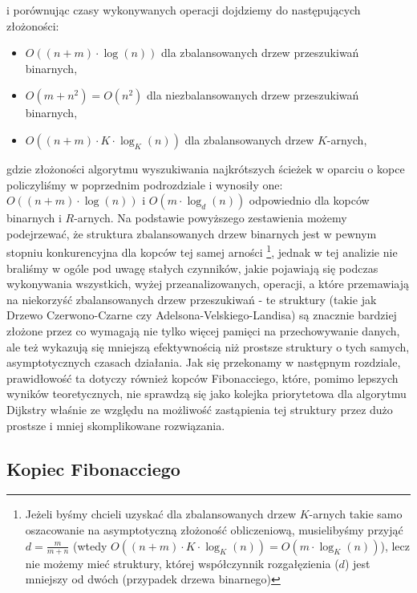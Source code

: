 i porównując czasy wykonywanych operacji dojdziemy do następujących złożoności:

\begin{itemize}
\item $ O \left( \left( n + m \right) \cdot \log \left( n \right) \right)$  dla zbalansowanych drzew przeszukiwań binarnych,
\item $ O \left( m + n^{2} \right) = O \left( n^{2} \right) $ dla niezbalansowanych drzew przeszukiwań binarnych,
\item $ O \left( \left( n + m \right) \cdot K \cdot \log_{K} \left( n \right) \right)$  dla zbalansowanych drzew $K$-arnych,
\end{itemize}

gdzie złożoności algorytmu wyszukiwania najkrótszych ścieżek w oparciu o kopce policzyliśmy w poprzednim podrozdziale i wynosiły one: $ O \left( \left( n + m \right) \cdot \log \left( n \right) \right) $ i $ O \left( m \cdot \log_{d} \left( n \right) \right) $ odpowiednio dla kopców binarnych i $R$-arnych. Na podstawie powyższego zestawienia możemy podejrzewać, że struktura zbalansowanych drzew binarnych jest w pewnym stopniu konkurencyjna dla kopców tej samej arności \footnote{Jeżeli byśmy chcieli uzyskać dla zbalansowanych drzew $K$-arnych takie samo oszacowanie na asymptotyczną złożoność obliczeniową, musielibyśmy przyjąć $d = \frac{m}{m+n}$ (wtedy $O \left( \left( n + m \right) \cdot K \cdot \log_{K} \left( n \right) \right) = O \left( m \cdot \log_{K} \left( n \right) \right) $), lecz nie możemy mieć struktury, której współczynnik rozgałęzienia ($d$) jest mniejszy od dwóch (przypadek drzewa binarnego)}, jednak w tej analizie nie braliśmy w ogóle pod uwagę stałych czynników, jakie pojawiają się podczas wykonywania wszystkich, wyżej przeanalizowanych, operacji, a które przemawiają na niekorzyść zbalansowanych drzew przeszukiwań - te struktury (takie jak Drzewo Czerwono-Czarne czy Adelsona-Velskiego-Landisa) są znacznie bardziej złożone przez co wymagają nie tylko więcej pamięci na przechowywanie danych, ale też wykazują się mniejszą efektywnością niż prostsze struktury o tych samych, asymptotycznych czasach działania. Jak się przekonamy w następnym rozdziale, prawidłowość ta dotyczy również kopców Fibonacciego, które, pomimo lepszych wyników teoretycznych, nie sprawdzą się jako kolejka priorytetowa dla algorytmu Dijkstry właśnie ze względu na możliwość zastąpienia tej struktury przez dużo prostsze i mniej skomplikowane rozwiązania.

\subsection{Kopiec Fibonacciego}

